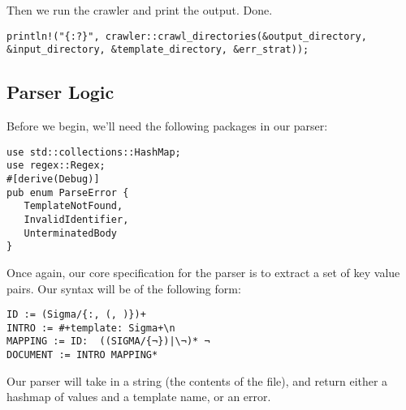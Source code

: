 \documentclass[11pt]{article}
\begin{document}
Then we run the crawler and print the output. Done.
\begin{verbatim}
println!("{:?}", crawler::crawl_directories(&output_directory, &input_directory, &template_directory, &err_strat));
\end{verbatim}



\subsection{Parser Logic}
\label{sec:orgb4328f2}
Before we begin, we'll need the following packages in our parser:
\begin{verbatim}
use std::collections::HashMap;
use regex::Regex;
#[derive(Debug)]
pub enum ParseError {
   TemplateNotFound,
   InvalidIdentifier,
   UnterminatedBody
}
\end{verbatim}
Once again, our core specification for the parser is to extract a set of key value pairs. Our syntax will be of the following form:
\begin{verbatim}
ID := (Sigma/{:, (, )})+
INTRO := #+template: Sigma+\n
MAPPING := ID:  ((SIGMA/{¬})|\¬)* ¬
DOCUMENT := INTRO MAPPING*
\end{verbatim}
Our parser will take in a string (the contents of the file), and return either a hashmap of values and a template name, or an error.
\end{document}
